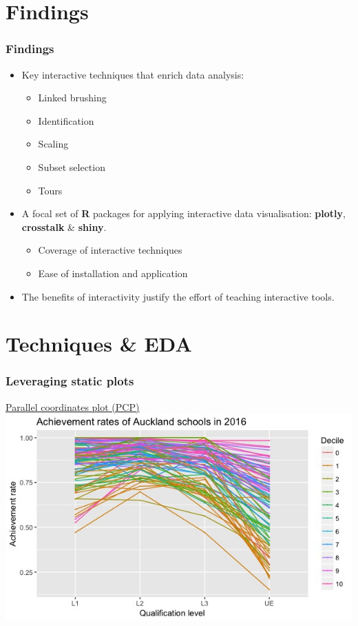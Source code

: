\documentclass{beamer}
\begin{document}
\section{Findings}
\label{sec:findings}

	\begin{frame}
		\frametitle{Findings}
		\begin{itemize}
			\item Key interactive techniques that enrich data analysis:
			\begin{itemize}
				\item Linked brushing
				\item Identification
				\item Scaling
				\item Subset selection
				\item Tours
			\end{itemize}
			\item A focal set of \textbf{R} packages for applying interactive data visualisation: \textbf{plotly}, \textbf{crosstalk} \& \textbf{shiny}.
			\begin{itemize}
				\item Coverage of interactive techniques
				\item Ease of installation and application
			\end{itemize}
		\item The benefits of interactivity justify the effort of teaching interactive tools.
		\end{itemize}
	\end{frame}

\section{Techniques \& EDA}
\label{sec:techniques}

	\begin{frame}
		\frametitle{Leveraging static plots}
		\href{https://shanl33.shinyapps.io/presentation_pcp/}{Parallel coordinates plot (PCP)}
		\includegraphics[scale=0.45]{files/pcp.jpeg}
	\end{frame}
\end{document}
